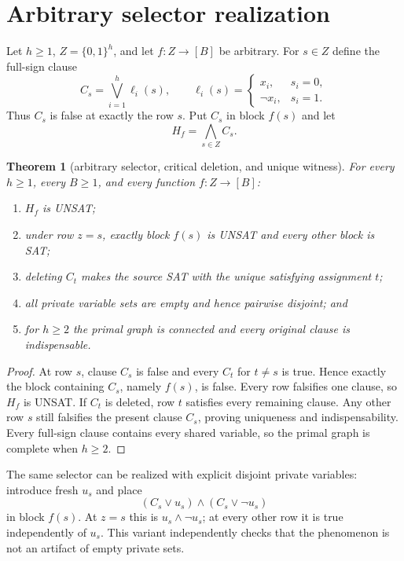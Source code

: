 \documentclass[11pt]{article}
\newtheorem{theorem}{Theorem}
\begin{document}
\section{Arbitrary selector realization}

Let $h\ge1$, $Z=\{0,1\}^h$, and let $f:Z\to[B]$ be arbitrary.  For $s\in Z$ define the full-sign clause
\[
 C_s=\bigvee_{i=1}^{h}\ell_i(s),\qquad
 \ell_i(s)=\begin{cases}x_i,&s_i=0,\\ \neg x_i,&s_i=1.\end{cases}
\]
Thus $C_s$ is false at exactly the row $s$.  Put $C_s$ in block $f(s)$ and let
\[
 H_f=\bigwedge_{s\in Z}C_s.
\]

\begin{theorem}[arbitrary selector, critical deletion, and unique witness]
For every $h\ge1$, every $B\ge1$, and every function $f:Z\to[B]$:
\begin{enumerate}
  \item $H_f$ is UNSAT;
  \item under row $z=s$, exactly block $f(s)$ is UNSAT and every other block is SAT;
  \item deleting $C_t$ makes the source SAT with the unique satisfying assignment $t$;
  \item all private variable sets are empty and hence pairwise disjoint; and
  \item for $h\ge2$ the primal graph is connected and every original clause is indispensable.
\end{enumerate}
\end{theorem}

\begin{proof}
At row $s$, clause $C_s$ is false and every $C_t$ for $t\ne s$ is true.  Hence exactly the block containing $C_s$, namely $f(s)$, is false.  Every row falsifies one clause, so $H_f$ is UNSAT.  If $C_t$ is deleted, row $t$ satisfies every remaining clause.  Any other row $s$ still falsifies the present clause $C_s$, proving uniqueness and indispensability.  Every full-sign clause contains every shared variable, so the primal graph is complete when $h\ge2$.
\end{proof}

The same selector can be realized with explicit disjoint private variables: introduce fresh $u_s$ and place
\[
 (C_s\lor u_s)\wedge(C_s\lor\neg u_s)
\]
in block $f(s)$.  At $z=s$ this is $u_s\wedge\neg u_s$; at every other row it is true independently of $u_s$.  This variant independently checks that the phenomenon is not an artifact of empty private sets.
\end{document}
